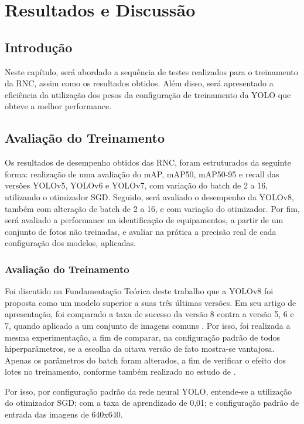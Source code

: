 \chapter{Resultados e Discussão}

\section{Introdução} 

Neste capítulo, será abordado a sequência de testes realizados para o treinamento da RNC, assim como os resultados obtidos. Além disso, será apresentado a eficiência da utilização dos pesos da configuração de treinamento da YOLO que obteve a melhor performance. 

\section{Avaliação do Treinamento} 

Os resultados de desempenho obtidos das RNC, foram estruturados da seguinte forma: realização de uma avaliação do mAP, mAP50, mAP50-95 e recall das versões YOLOv5, YOLOv6 e YOLOv7, com variação do batch de 2 a 16, utilizando o otimizador SGD. Seguido, será avaliado o desempenho da YOLOv8, também com alteração de batch de 2 a 16, e com variação do otimizador. Por fim, será avaliado a performance na identificação de equipamentos, a partir de um conjunto de fotos não treinadas, e avaliar na prática a precisão real de cada configuração dos modelos, aplicadas. 

\subsection{Avaliação do Treinamento} 

Foi discutido na Fundamentação Teórica deste trabalho que a YOLOv8 foi proposta como um modelo superior a suas três últimas versões. Em seu artigo de apresentação, foi comparado a taxa de sucesso da versão 8 contra a versão 5, 6 e 7, quando aplicado a um conjunto de imagens comuns \cite{ultralytics2023yolo}. Por isso, foi realizada a mesma experimentação, a fim de comparar, na configuração padrão de todos hiperparâmetros, se a escolha da oitava versão de fato mostra-se vantajosa. Apenas os parâmetros do batch foram alterados, a fim de verificar o efeito dos lotes no treinamento, conforme também realizado no estudo de \cite{almeida2023batch}.

Por isso, por configuração padrão da rede neural YOLO, entende-se a utilização do otimizador SGD; com a taxa de aprendizado de 0,01; e configuração padrão de entrada das imagens de 640x640. 

